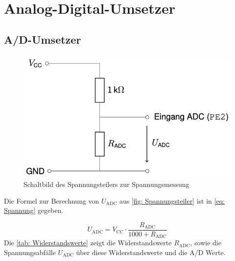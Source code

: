 \section{Analog-Digital-Umsetzer}
\subsection{A/D-Umsetzer}
\subsubsection{}

\begin{figure}[H]
\centering
\includegraphics[scale=0.75]{Spannungsteiler.png}
\caption{Schaltbild des Spannungsteilers zur Spannungsmessung}
\label{fig: Spannungsteiler}
\end{figure}

Die Formel zur Berechnung von $U_{\text{ADC}}$ aus \autoref{fig: Spannungsteiler} ist in \autoref{eq: Spannung} gegeben.

\begin{equation}
\label{eq: Spannung}
U_{\text{ADC}}=V_{\text{CC}}\cdot \frac{R_{\text{ADC}}}{1000+R_{\text{ADC}}}
\end{equation}
Die \autoref{tab: Widerstandswerte} zeigt die Widerstandswerte $R_{\text{ADC}}$, sowie die Spannungsabfälle $U_{\text{ADC}}$ über diese Widerstandswerte und die A/D Werte.

